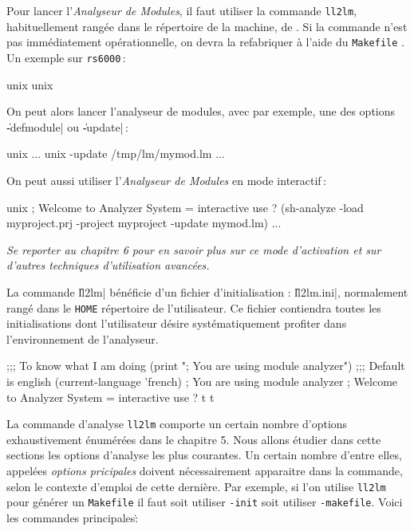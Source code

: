 
Pour lancer l'{\em Analyseur de Modules}, il faut utiliser la
commande {\tt ll2lm}, habituellement rang\'{e}e dans le r\'{e}pertoire de la
machine, de \LeLisp . Si la commande n'est pas imm\'{e}diatement
op\'{e}rationnelle, on devra la refabriquer \`{a} l'aide du {\tt Makefile}
\LeLisp . Un exemple sur {\tt rs6000}\,:
\begin{Code*}
unix%
unix%
\end{Code*}
On peut alors lancer l'analyseur de modules, avec par exemple, une des
options \|-defmodule| ou \|-update|\,: 
\begin{Code*}
unix%
 ...
unix%
            -update /tmp/lm/mymod.lm
...
\end{Code*}

On peut aussi utiliser l'{\em Analyseur de Modules} en mode interactif\,:
\begin{Code*}
unix%
; Welcome to Analyzer System
= interactive use
? (sh-analyze -load myproject.prj -project myproject -update mymod.lm)
 ...
\end{Code*}

{\it Se reporter au chapitre 6 pour en savoir plus sur ce mode d'activation
et sur d'autres techniques d'utilisation avanc\'{e}es.}

\medskip

La commande \|ll2lm| b\'{e}n\'{e}ficie d'un fichier d'initialisation :
\|ll2lm.ini|, normalement rang\'{e} dans le {\tt HOME} r\'{e}pertoire de
l'utilisateur. Ce fichier contiendra toutes les initialisations dont
l'utilisateur d\'{e}sire syst\'{e}matiquement profiter dans l'environnement
de l'analyseur.
\begin{Code*}
;;; To know what I am doing
(print "; You are using module analyzer")
;;; Default is english
(current-language 'french)
; You are using module analyzer
; Welcome to Analyzer System
= interactive use
? t
t
\end{Code*}


La commande d'analyse {\tt ll2lm} comporte un certain nombre d'options
exhaustivement \'{e}num\'{e}r\'{e}es dans le chapitre 5. 
Nous allons \'{e}tudier dans cette sections les options d'analyse les plus
courantes.
Un certain nombre d'entre elles, appel\'{e}es {\it
options pricipales} doivent n\'{e}cessairement apparaitre dans la
commande, selon le contexte d'emploi de cette derni\`{e}re. Par exemple,
si l'on utilise {\tt ll2lm} pour g\'{e}n\'{e}rer un {\tt Makefile}
il faut soit utiliser {\tt -init} soit utiliser {\tt -makefile}.
Voici les commandes principales\.:


